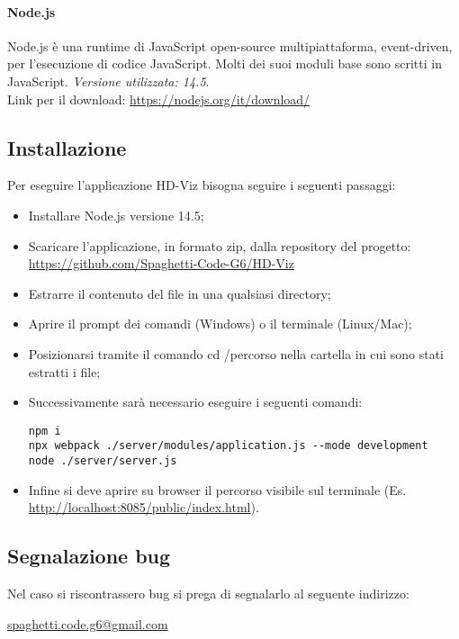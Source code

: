 \documentclass[../manuale_utente.tex]{subfiles}
\begin{document}
\paragraph{Node.js}
    \label{par:node}
Node.js è una runtime di JavaScript open-source multipiattaforma, event-driven, per l’esecuzione di codice JavaScript. Molti dei suoi moduli base sono scritti in JavaScript. 
\emph{Versione utilizzata: 14.5}.\\
Link per il download: \url{https://nodejs.org/it/download/}

\subsection{Installazione}
    \label{sub:inst}


Per eseguire l’applicazione HD-Viz bisogna seguire i seguenti passaggi:
\begin{itemize}
    \item Installare Node.js versione 14.5;
    \item Scaricare l’applicazione, in formato zip, dalla repository del progetto: \url{https://github.com/Spaghetti-Code-G6/HD-Viz}
    \item Estrarre il contenuto del file in una qualsiasi directory; 
    \item Aprire il prompt dei comandi (Windows) o il terminale (Linux/Mac); 
    \item Posizionarsi tramite il comando cd /percorso nella cartella in cui sono stati estratti i file;
    \item Successivamente sarà necessario eseguire i seguenti comandi:
    \begin{center}
        \verb|npm i| \\ 
        \verb|npx webpack ./server/modules/application.js --mode development| \\ 
        \verb|node ./server/server.js|
    \end{center}
    \item Infine si deve aprire su browser il percorso visibile sul terminale (Es. \url{http://localhost:8085/public/index.html}).
\end{itemize}


\subsection{Segnalazione bug}
Nel caso si riscontrassero bug si prega di segnalarlo al seguente indirizzo:\\
\begin{center}\href{mailto:spaghetti.code.g6@gmail.com}{spaghetti.code.g6@gmail.com}\end{center}
\end{document}
